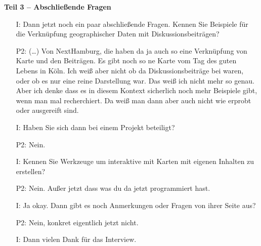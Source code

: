 \textbf{Teil 3 -- Abschlie{\ss}ende Fragen}
\begin{itemize}
    \item[I:] Dann jetzt noch ein paar abschlie{\ss}ende Fragen. Kennen Sie Beispiele f{\"u}r die Verkn{\"u}pfung geographischer Daten mit Diskussionsbeitr{\"a}gen?
    \item[P2:] (\dots) Von NextHamburg, die haben da ja auch so eine Verkn{\"u}pfung von Karte und den Beitr{\"a}gen. Es gibt noch so ne Karte vom Tag des guten Lebens in K{\"o}ln. Ich wei{\ss} aber nicht ob da Diskussionsbeitr{\"a}ge bei waren, oder ob es nur eine reine Darstellung war. Das wei{\ss} ich nicht mehr so genau. Aber ich denke dass es in diesem Kontext sicherlich noch mehr Beispiele gibt, wenn man mal recherchiert. Da wei{\ss} man dann aber auch nicht wie erprobt oder ausgereift sind.
    \item[I:] Haben Sie sich dann bei einem Projekt beteiligt?
    \item[P2:] Nein.
    \item[I:] Kennen Sie Werkzeuge um interaktive mit Karten mit eigenen Inhalten zu erstellen?
    \item[P2:] Nein. Au{\ss}er jetzt dass was du da jetzt programmiert hast. 
    \item[I:] Ja okay. Dann gibt es noch Anmerkungen oder Fragen von ihrer Seite aus?
    \item[P2:] Nein, konkret eigentlich jetzt nicht.
    \item[I:] Dann vielen Dank f{\"u}r das Interview.
\end{itemize}